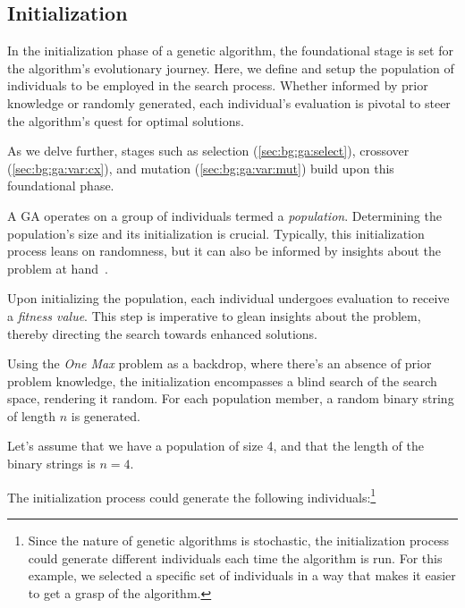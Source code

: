 \subsection{Initialization}
\label{sec:genetic_algorithms:initialization}

  In the initialization phase of a genetic algorithm, the foundational stage is 
  set for the algorithm's evolutionary journey.
  Here, we define and setup the population of individuals to be employed in the 
  search process.
  Whether informed by prior knowledge or randomly generated, each individual's 
  evaluation is pivotal to steer the algorithm's quest for optimal solutions.

  As we delve further, stages such as selection 
  (\vref{sec:bg:ga:select}), crossover 
  (\vref{sec:bg:ga:var:cx}), and mutation (\vref{sec:bg:ga:var:mut}) build upon 
  this foundational phase.

  A GA operates on a group of individuals termed a \emph{population}.
  Determining the population's size and its initialization is crucial.
  Typically, this initialization process leans on randomness, but it can also 
  be informed by insights about the problem at 
  hand~\autocite{dasguptaComparisonMultiobjectiveEvolutionary2008}.
  
  Upon initializing the population, each individual undergoes evaluation to 
  receive a \emph{fitness value}.
  This step is imperative to glean insights about the problem, thereby directing 
  the search towards enhanced solutions.

  Using the \emph{One Max} problem as a backdrop, where there's an absence of 
  prior problem knowledge, the initialization encompasses a blind search of the 
  search space, rendering it random.
  For each population member, a random binary string of length \(n\) is 
  generated.

  Let's assume that we have a population of size 4, and that the length of the 
  binary strings is \(n = 4\).

  The initialization process could generate the following individuals:\footnote{
    Since the nature of genetic algorithms is stochastic, the initialization 
    process could generate different individuals each time the algorithm is run.
    For this example, we selected a specific set of individuals in a way that 
    makes it easier to get a grasp of the algorithm.
  }

